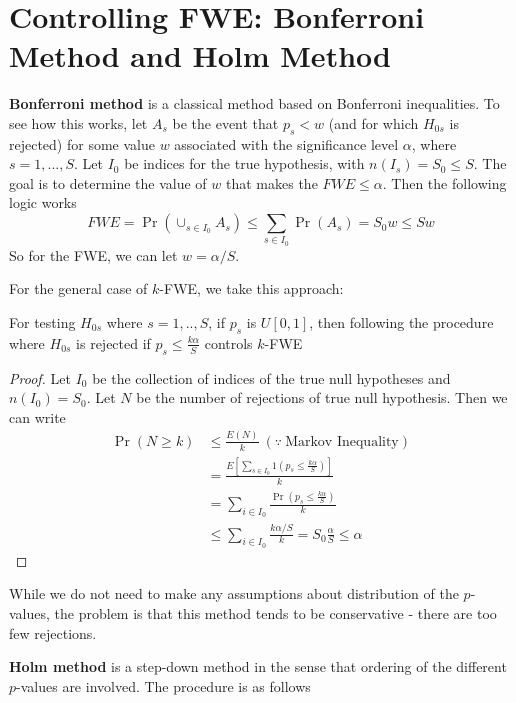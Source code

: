\section{Controlling FWE: Bonferroni Method and Holm Method}\textbf{Bonferroni method} is a classical method based on Bonferroni inequalities. To see how this works, let $A_s$ be the event that $p_s<w$ (and for which $H_{0s}$ is rejected) for some value $w$ associated with the significance level $\alpha$, where $s=1,...,S$. Let $I_0$ be indices for the true hypothesis, with $n(I_s)=S_0\leq S.$ The goal is to determine the value of $w$ that makes the $FWE\leq\alpha$.  Then the following logic works
\[
FWE = \Pr(\cup_{s\in I_0}A_s)\leq \sum_{s\in I_0}\Pr(A_s) = S_0 w \leq S w
\]
So for the FWE, we can let $w=\alpha/S$. \par
 For the general case of $k$-FWE, we take this approach:
\begin{mdframed}[backgroundcolor=green!5] 
\begin{theorem}  For testing $H_{0s}$ where $s=1,..,S$, if $p_s$ is $U[0,1]$, then following the procedure where $H_{0s}$ is rejected if $p_s\leq \frac{k\alpha}{S}$ controls $k$-FWE
\begin{proof}
Let $I_0$ be the collection of indices of the true null hypotheses and $n(I_0)=S_0$. Let $N$ be the number of rejections of true null hypothesis. Then we can write
\begin{align*}
\Pr(N\geq k)& \leq \frac{E(N)}{k} \ (\because \ \text{Markov Inequality})\\
& = \frac{E\left[\sum_{s\in I_0} 1\left(p_s\leq \frac{k\alpha}{S}\right)\right]}{k}\\
&=\sum_{i\in I_0}\frac{\Pr\left(p_s \leq \frac{k\alpha}{S} \right)}{k}\\
&\leq \sum_{i\in I_0}\frac{k\alpha /S}{k} = S_0\frac{\alpha}{S}\leq \alpha
\end{align*}
\end{proof}
\end{theorem}
\end{mdframed} \par
While we do not need to make any assumptions about distribution of the $p$-values, the problem is that this method tends to be conservative - there are too few rejections. \par
\textbf{Holm method} is a step-down method in the sense that ordering of the different $p$-values are involved. The procedure is as follows
